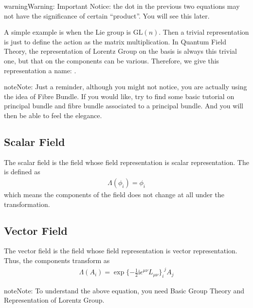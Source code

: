 \documentclass[letterpaper,10pt,english]{sphinxmanual}
\begin{document}
\begin{sphinxadmonition}{warning}{Warning:}
Important Notice: the dot in the previous two equations may not have the significance of certain ``product''. You will see this later.
\end{sphinxadmonition}

A simple example is when the Lie group is \(\mathrm{GL}(n)\). Then a trivial representation is just to define the action as the matrix multiplication. In Quantum Field Theory, the representation of Lorentz Group on the basis is always this trivial one, but that on the components can be various. Therefore, we give this representation a name: .

\begin{sphinxadmonition}{note}{Note:}
Just a reminder, although you might not notice, you are actually using the idea of Fibre Bundle. If you would like, try to find some basic tutorial on principal bundle and fibre bundle associated to a principal bundle. And you will then be able to feel the elegance.
\end{sphinxadmonition}


\subsection{Scalar Field}
\label{\detokenize{field:scalar-field}}
The scalar field is the field whose field representation is scalar representation. The  is defined as
\begin{equation*}
\begin{split}\varLambda(\phi_i) = \phi_i\end{split}
\end{equation*}
which means the components of the field does not change at all under the transformation.


\subsection{Vector Field}
\label{\detokenize{field:vector-field}}
The vector field is the field whose field representation is vector representation. Thus, the components transform as
\begin{equation*}
\begin{split}\varLambda(A_i) = \exp\{-\frac{1}{2}\mathrm{i}\epsilon^{\mu\nu}L_{\mu\nu}{\}_i}^jA_j\end{split}
\end{equation*}
\begin{sphinxadmonition}{note}{Note:}
To understand the above equation, you need Basic Group Theory and Representation of Lorentz Group.
\end{sphinxadmonition}
\end{document}
